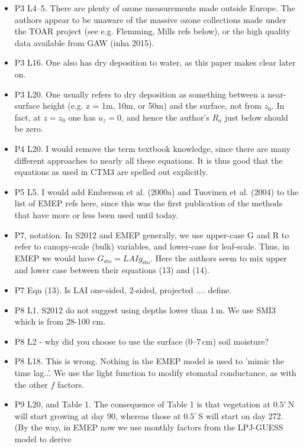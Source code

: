 \documentclass{scrartcl}
\begin{document}
\begin{itemize}
\item {\color{blue}P3 L4--5. There are plenty of ozone measurements made outside Europe. The
authors appear to be unaware of the massive ozone collections made under the
TOAR project (see e.g. Flemming, Mills refs below), or the high quality data
available from GAW (inha 2015).}
\item {\color{blue}P3 L16. One also has dry deposition to water, as this paper makes clear later
on.}
\item {\color{blue}P3 L20. One usually refers to dry deposition as something between a near-
surface height (e.g. z = 1m, 10m, or 50m) and the surface, not from $z_0$. In fact,
at $z = z_0$ one has $u_z = 0$, and hence the author’s $R_a$ just below should be zero.}
\item {\color{blue}P4 L20. I would remove the term textbook knowledge, since there are many
different approaches to nearly all these equations. It is thus good that the equations
as used in CTM3 are spelled out explicitly.}
\item {\color{blue}P5 L5. I would add Emberson et al. (2000a) and Tuovinen et al. (2004) to
the list of EMEP refs here, since this was the first publication of the methods that
have more or less been used until today.}
\item {\color{blue}P7, notation. In S2012 and EMEP generally, we use upper-case G and R to refer
to canopy-scale (bulk) variables, and lower-case for leaf-scale. Thus, in EMEP
we would have $G_\mathrm{sto} = LAI g_\mathrm{sto}$. Here the authors seem to mix upper and lower
case between their equations (13) and (14).}
\item {\color{blue}P7 Eqn (13). Is LAI one-sided, 2-sided, projected .... define.}
\item {\color{blue}P8 L1. S2012 do not suggest using depths lower than 1\,m. We use SMI3 which
is from 28-100 cm.}
\item {\color{blue}P8 L2 - why did you choose to use the surface (0--7\,cm) soil moisture?}
\item {\color{blue}P8 L18. This is wrong. Nothing in the EMEP model is used to ’mimic the
time lag..’. We use the light function to modify stomatal conductance, as with the
other $f$ factors.}
\item {\color{blue}P9 L20, and Table 1. The consequence of Table 1 is that vegetation at $0.5^\circ\,\mathrm{N}$
will start growing at day 90, whereas those at $0.5^\circ\,\mathrm{S}$ will start on day 272. (By the
way, in EMEP now we use monthly factors from the LPJ-GUESS model to derive
}
\end{itemize}
\end{document}

